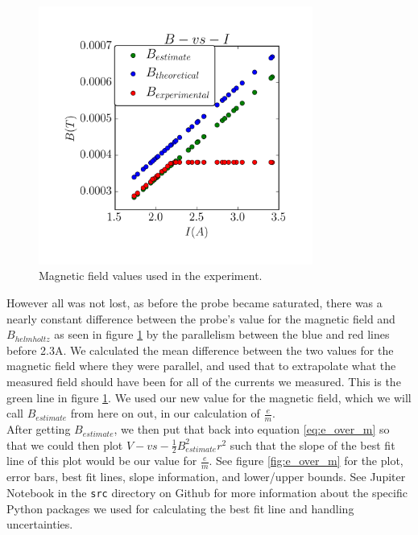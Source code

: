 \documentclass[aps,twocolumn,secnumarabic,amsmath,amssymb,nofootinbib]{revtex4-1}
\begin{document}
\begin{figure}[ht]
\includegraphics[width=9cm, keepaspectratio]{../images/comparing_b_5in.png}
\caption{Magnetic field values used in the experiment.}
\label{fig:b_vals}
\end{figure}

However all was not lost, as before the probe became saturated, there was a nearly constant difference between the probe's value for the magnetic field and $B_{helmholtz}$ as seen in figure \ref{fig:b_vals} by the parallelism between the blue and red lines before 2.3A. We calculated the mean difference between the two values for the magnetic field where they were parallel, and used that to extrapolate what the measured field should have been for all of the currents we measured. This is the green line in figure \ref{fig:b_vals}. We used our new value for the magnetic field, which we will call $B_{estimate}$ from here on out, in our calculation of $\frac{e}{m}$. \\

After getting $B_{estimate}$, we then put that back into equation \ref{eq:e_over_m} so that we could then plot $V-vs-\frac{1}{2}B_{estimate}^2r^2$ such that the slope of the best fit line of this plot would be our value for $\frac{e}{m}$. See figure \ref{fig:e_over_m} for the plot, error bars, best fit lines, slope information, and lower/upper bounds. See Jupiter Notebook in the \texttt{src} directory on Github \cite{github} for more information about the specific Python packages we used for calculating the best fit line and handling uncertainties.
\end{document}

